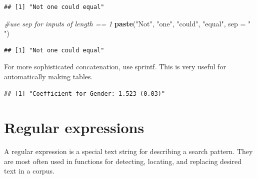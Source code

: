 \documentclass[]{book}
\newenvironment{Shaded}{\begin{snugshade}}{\end{snugshade}}
\newcommand{\KeywordTok}[1]{\textcolor[rgb]{0.13,0.29,0.53}{\textbf{#1}}}
\newcommand{\DataTypeTok}[1]{\textcolor[rgb]{0.13,0.29,0.53}{#1}}
\newcommand{\FloatTok}[1]{\textcolor[rgb]{0.00,0.00,0.81}{#1}}
\newcommand{\StringTok}[1]{\textcolor[rgb]{0.31,0.60,0.02}{#1}}
\newcommand{\CommentTok}[1]{\textcolor[rgb]{0.56,0.35,0.01}{\textit{#1}}}
\newcommand{\NormalTok}[1]{#1}
\theoremstyle{definition}
\theoremstyle{definition}
\theoremstyle{definition}
\theoremstyle{remark}
\begin{document}
\begin{verbatim}
## [1] "Not one could equal"
\end{verbatim}

\begin{Shaded}
\begin{Highlighting}[]
\CommentTok{#use sep for inputs of length == 1 }
\KeywordTok{paste}\NormalTok{(}\StringTok{"Not"}\NormalTok{, }\StringTok{"one"}\NormalTok{, }\StringTok{"could"}\NormalTok{, }\StringTok{"equal"}\NormalTok{, }\DataTypeTok{sep =} \StringTok{" "}\NormalTok{)}
\end{Highlighting}
\end{Shaded}

\begin{verbatim}
## [1] "Not one could equal"
\end{verbatim}

For more sophisticated concatenation, use sprintf. This is very useful
for automatically making tables.

\begin{Shaded}
\end{Shaded}

\begin{verbatim}
## [1] "Coefficient for Gender: 1.523 (0.03)"
\end{verbatim}

\begin{Shaded}
\begin{Highlighting}[]
\CommentTok{#%
\CommentTok{#%
\CommentTok{#%
\end{Highlighting}
\end{Shaded}

\section{Regular expressions}\label{regular-expressions}

A regular expression is a special text string for describing a search
pattern. They are most often used in functions for detecting, locating,
and replacing desired text in a corpus.
\end{document}

